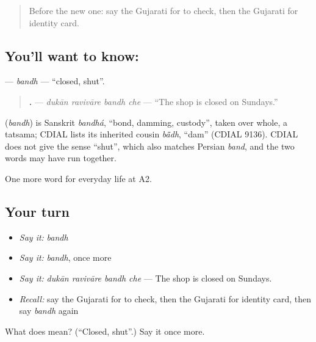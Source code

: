 \label{lesson:GU-C197-bandh}



\begin{quote}
Before the new one: say the Gujarati for to check, then the Gujarati for identity card.
\end{quote}

\subsection*{You'll want to know: }
\textbf{} — \emph{bandh} — \textquotedblleft{}closed, shut\textquotedblright{}.

\begin{quote}
\textbf{   .} — \emph{dukān ravivāre bandh che} — \textquotedblleft{}The shop is closed on Sundays.\textquotedblright{}
\end{quote}

\begin{cousinweb}
\textbf{} (\emph{bandh}) is Sanskrit \emph{bandhá}, \textquotedblleft{}bond, damming, custody\textquotedblright{}, taken over whole, a tatsama; CDIAL lists its inherited cousin \emph{bā̃dh}, \textquotedblleft{}dam\textquotedblright{} (CDIAL 9136). CDIAL does not give the sense \textquotedblleft{}shut\textquotedblright{}, which also matches Persian \emph{band}, and the two words may have run together.
\end{cousinweb}

\begin{grammarlens}[title={What you've built}]
One more word for everyday life at A2.
\end{grammarlens}

\subsection*{Your turn}
\begin{itemize}
\raggedright
  \item \emph{Say it:} \emph{bandh}
  \item \emph{Say it:} \emph{bandh}, once more
  \item \emph{Say it:} \emph{dukān ravivāre bandh che} — The shop is closed on Sundays.
  \item \emph{Recall:} say the Gujarati for to check, then the Gujarati for identity card, then say \emph{bandh} again
\end{itemize}

\begin{tcolorbox}[breakable,colback=teal!4,colframe=teal!35!black,title={Before you move on}]
What does  mean? (\textquotedblleft{}Closed, shut\textquotedblright{}.) Say it once more.
\end{tcolorbox}
